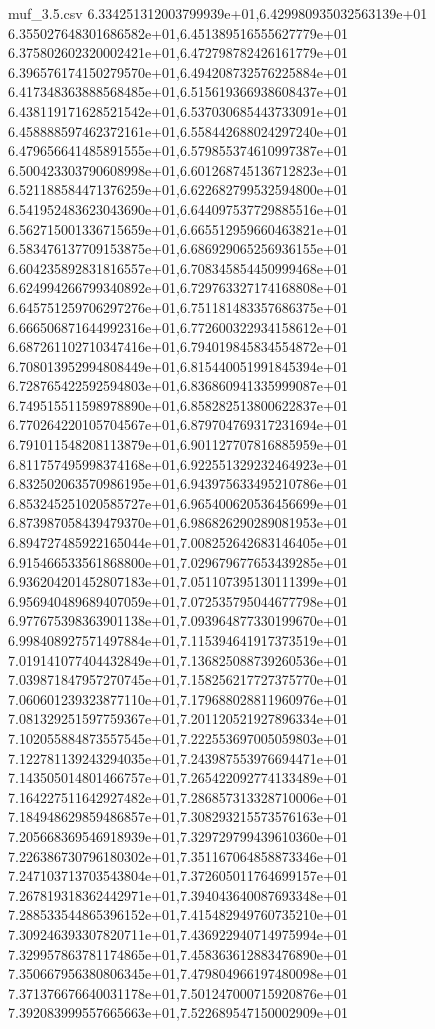 \begin{filecontents*}{muf_3.5.csv}
6.334251312003799939e+01,6.429980935032563139e+01
6.355027648301686582e+01,6.451389516555627779e+01
6.375802602320002421e+01,6.472798782426161779e+01
6.396576174150279570e+01,6.494208732576225884e+01
6.417348363888568485e+01,6.515619366938608437e+01
6.438119171628521542e+01,6.537030685443733091e+01
6.458888597462372161e+01,6.558442688024297240e+01
6.479656641485891555e+01,6.579855374610997387e+01
6.500423303790608998e+01,6.601268745136712823e+01
6.521188584471376259e+01,6.622682799532594800e+01
6.541952483623043690e+01,6.644097537729885516e+01
6.562715001336715659e+01,6.665512959660463821e+01
6.583476137709153875e+01,6.686929065256936155e+01
6.604235892831816557e+01,6.708345854450999468e+01
6.624994266799340892e+01,6.729763327174168808e+01
6.645751259706297276e+01,6.751181483357686375e+01
6.666506871644992316e+01,6.772600322934158612e+01
6.687261102710347416e+01,6.794019845834554872e+01
6.708013952994808449e+01,6.815440051991845394e+01
6.728765422592594803e+01,6.836860941335999087e+01
6.749515511598978890e+01,6.858282513800622837e+01
6.770264220105704567e+01,6.879704769317231694e+01
6.791011548208113879e+01,6.901127707816885959e+01
6.811757495998374168e+01,6.922551329232464923e+01
6.832502063570986195e+01,6.943975633495210786e+01
6.853245251020585727e+01,6.965400620536456699e+01
6.873987058439479370e+01,6.986826290289081953e+01
6.894727485922165044e+01,7.008252642683146405e+01
6.915466533561868800e+01,7.029679677653439285e+01
6.936204201452807183e+01,7.051107395130111399e+01
6.956940489689407059e+01,7.072535795044677798e+01
6.977675398363901138e+01,7.093964877330199670e+01
6.998408927571497884e+01,7.115394641917373519e+01
7.019141077404432849e+01,7.136825088739260536e+01
7.039871847957270745e+01,7.158256217727375770e+01
7.060601239323877110e+01,7.179688028811960976e+01
7.081329251597759367e+01,7.201120521927896334e+01
7.102055884873557545e+01,7.222553697005059803e+01
7.122781139243294035e+01,7.243987553976694471e+01
7.143505014801466757e+01,7.265422092774133489e+01
7.164227511642927482e+01,7.286857313328710006e+01
7.184948629859486857e+01,7.308293215573576163e+01
7.205668369546918939e+01,7.329729799439610360e+01
7.226386730796180302e+01,7.351167064858873346e+01
7.247103713703543804e+01,7.372605011764699157e+01
7.267819318362442971e+01,7.394043640087693348e+01
7.288533544865396152e+01,7.415482949760735210e+01
7.309246393307820711e+01,7.436922940714975994e+01
7.329957863781174865e+01,7.458363612883476890e+01
7.350667956380806345e+01,7.479804966197480098e+01
7.371376676640031178e+01,7.501247000715920876e+01
7.392083999557665663e+01,7.522689547150002909e+01

\end{filecontents*}
